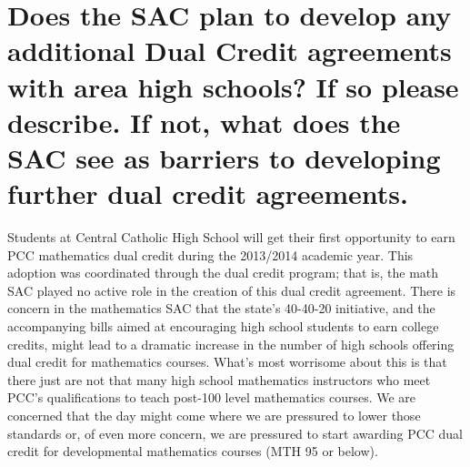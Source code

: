 \section[Future dual credit relationships]{Does the SAC plan to develop any additional Dual Credit agreements with area high schools?  If so please describe.   If not, what does the SAC see as barriers to developing further dual credit agreements. }
Students at Central Catholic High School will get their first opportunity to earn PCC mathematics dual credit during the 2013/2014 academic year.  This adoption was coordinated through the dual credit program; that is, the math SAC played no active role in the creation of this dual credit agreement.
There is concern in the mathematics SAC that the state's 40-40-20 initiative, and the accompanying bills aimed at encouraging high school students to earn college credits, might lead to a dramatic increase in the number of high schools offering dual credit for mathematics courses.  What's most worrisome about this is that there just are not that many high school mathematics instructors who meet PCC's qualifications to teach post-100 level mathematics courses.  We are concerned that the day might come where we are pressured to lower those standards or, of even more concern, we are pressured to start awarding PCC dual credit for developmental mathematics courses (MTH 95 or below).
